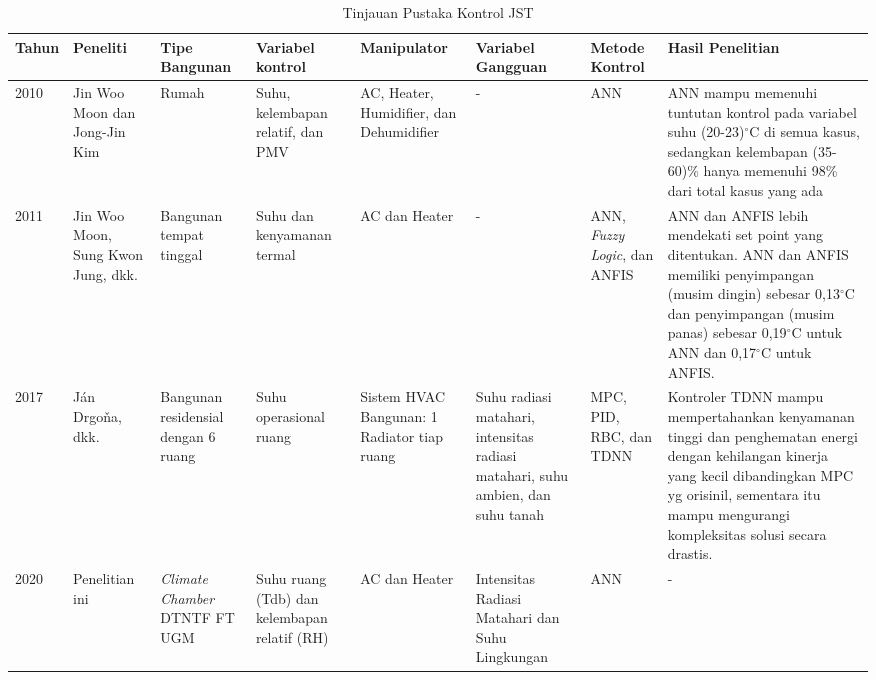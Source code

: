 \begin{landscape}
	\begin{table}[hbt!]
		\caption{Tinjauan Pustaka Kontrol JST}
		\label{tbl:2:studiANN}
		\centering
		\begin{tabular}{|p{1cm}|p{2cm}|p{1.8cm}|p{2.7cm}|p{2.5cm}|p{3.2cm}|p{1.8cm}|p{6.7cm}|}
			\hline
			
			Tahun & Peneliti & Tipe Bangunan & Variabel kontrol & Manipulator & Variabel Gangguan & Metode Kontrol & Hasil Penelitian \\ \hline
			
			2010 \cite{paper22JJkim} & Jin Woo Moon dan Jong-Jin Kim & Rumah & Suhu, kelembapan relatif, dan PMV & AC, Heater, Humidifier, dan Dehumidifier & - & ANN & ANN mampu memenuhi tuntutan kontrol pada variabel suhu (20-23)$^{\circ}$C di semua kasus, sedangkan kelembapan (35-60)\% hanya memenuhi 98\% dari total kasus yang ada \\ \hline
			
			2011 \cite{paper22SKJung} & Jin Woo Moon, Sung Kwon Jung, dkk. & Bangunan tempat tinggal& Suhu dan kenyamanan termal & AC dan Heater & - & ANN, \textit{Fuzzy Logic}, dan ANFIS & ANN dan ANFIS lebih mendekati set point yang ditentukan. ANN dan ANFIS memiliki penyimpangan (musim dingin) sebesar 0,13$^{\circ}$C dan penyimpangan (musim panas) sebesar 0,19$^{\circ}$C untuk ANN dan 0,17$^{\circ}$C untuk ANFIS. \\ \hline
			
			2017 \cite{paper22JanDrgona} & Ján Drgoňa, dkk. & Bangunan residensial dengan 6 ruang & Suhu operasional ruang & Sistem HVAC Bangunan: 1 Radiator tiap ruang & Suhu radiasi matahari, intensitas radiasi matahari, suhu ambien, dan suhu tanah & MPC, PID, RBC, dan TDNN & Kontroler TDNN mampu mempertahankan kenyamanan tinggi dan penghematan energi dengan kehilangan kinerja yang kecil dibandingkan MPC yg orisinil, sementara itu mampu mengurangi kompleksitas solusi secara drastis. \\ \hline
			
			2020 & Penelitian ini & \textit{Climate Chamber} DTNTF FT UGM & Suhu ruang (Tdb) dan kelembapan relatif (RH) & AC dan Heater & Intensitas Radiasi Matahari dan Suhu Lingkungan & ANN & - \\ \hline
		\end{tabular}
	\end{table}
\end{landscape}
